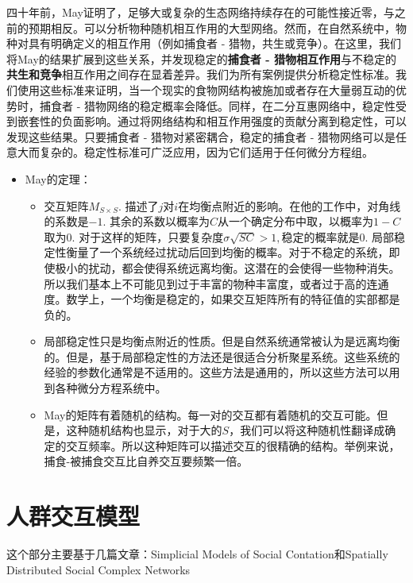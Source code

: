 四十年前，May证明了，足够大或复杂的生态网络持续存在的可能性接近零，与之前的预期相反。可以分析物种随机相互作用的大型网络。然而，在自然系统中，物种对具有明确定义的相互作用（例如捕食者
-
猎物，共生或竞争）。在这里，我们将May的结果扩展到这些关系，并发现稳定的\textbf{捕食者
-
猎物相互作用}与不稳定的\textbf{共生和竞争}相互作用之间存在显着差异。我们为所有案例提供分析稳定性标准。我们使用这些标准来证明，当一个现实的食物网结构被施加或者存在大量弱互动的优势时，捕食者
-
猎物网络的稳定概率会降低。同样，在二分互惠网络中，稳定性受到嵌套性的负面影响。通过将网络结构和相互作用强度的贡献分离到稳定性，可以发现这些结果。只要捕食者
- 猎物对紧密耦合，稳定的捕食者 -
猎物网络可以是任意大而复杂的。稳定性标准可广泛应用，因为它们适用于任何微分方程组。

\begin{itemize}
\item
  May的定理：

  \begin{itemize}
  \item
    交互矩阵\(M_{S\times S}.\)
    描述了\(j\)对\(i\)在均衡点附近的影响。在他的工作中，对角线的系数是\(-1.\)
    其余的系数以概率为\(C\)从一个确定分布中取，以概率为\(1-C\)取为\(0.\)
    对于这样的矩阵，只要复杂度\(\sigma\sqrt{SC}>1,\)稳定的概率就是\(0.\)
    局部稳定性衡量了一个系统经过扰动后回到均衡的概率。对于不稳定的系统，即使极小的扰动，都会使得系统远离均衡。这潜在的会使得一些物种消失。所以我们基本上不可能见到过于丰富的物种丰富度，或者过于高的连通度。数学上，一个均衡是稳定的，如果交互矩阵所有的特征值的实部都是负的。
  \item
    局部稳定性只是均衡点附近的性质。但是自然系统通常被认为是远离均衡的。但是，基于局部稳定性的方法还是很适合分析聚星系统。这些系统的经验的参数化通常是不适用的。这些方法是通用的，所以这些方法可以用到各种微分方程系统中。
  \item
    May的矩阵有着随机的结构。每一对的交互都有着随机的交互可能。但是，这种随机结构也显示，对于大的\(S\)，我们可以将这种随机性翻译成确定的交互频率。所以这种矩阵可以描述交互的很精确的结构。举例来说，捕食-被捕食交互比自养交互要频繁一倍。
  \end{itemize}
\end{itemize}

\section{人群交互模型}

这个部分主要基于几篇文章：Simplicial Models of Social Contation\cite{IacopiniSimplicial}和Spatially Distributed Social Complex Networks\cite{PhysRevX.4.011008}

